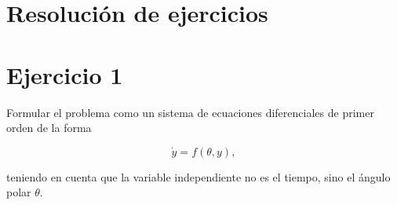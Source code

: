 \documentclass[10pt,a4paper]{article}
\newcounter{ejercicio}
\begin{document}
\newpage



\section*{Resolución de ejercicios}


\section*{Ejercicio 1}

Formular el problema como un sistema de ecuaciones diferenciales de primer orden de la forma

\[
\dot{y} = f(\theta,y),
\]

teniendo en cuenta que la variable independiente no es el tiempo, sino el ángulo polar $\theta$.

\vspace{0.5 cm}
\end{document}
